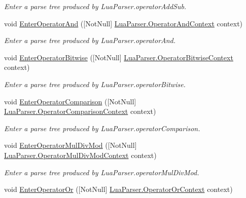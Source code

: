 \begin{DoxyCompactItemize}
\begin{DoxyCompactList}\small\item\em Enter a parse tree produced by Lua\+Parser.\+operator\+Add\+Sub. \end{DoxyCompactList}\item 
void \mbox{\hyperlink{classzlua_1_1_compiler_a028404702602498261a23021b36b5a87}{Enter\+Operator\+And}} (\mbox{[}Not\+Null\mbox{]} \mbox{\hyperlink{classzlua_1_1_lua_parser_1_1_operator_and_context}{Lua\+Parser.\+Operator\+And\+Context}} context)
\begin{DoxyCompactList}\small\item\em Enter a parse tree produced by Lua\+Parser.\+operator\+And. \end{DoxyCompactList}\item 
void \mbox{\hyperlink{classzlua_1_1_compiler_a13c55dd9aa0ccdf16a6855282091f63f}{Enter\+Operator\+Bitwise}} (\mbox{[}Not\+Null\mbox{]} \mbox{\hyperlink{classzlua_1_1_lua_parser_1_1_operator_bitwise_context}{Lua\+Parser.\+Operator\+Bitwise\+Context}} context)
\begin{DoxyCompactList}\small\item\em Enter a parse tree produced by Lua\+Parser.\+operator\+Bitwise. \end{DoxyCompactList}\item 
void \mbox{\hyperlink{classzlua_1_1_compiler_ac4a8baa233d08987d8f276972567c343}{Enter\+Operator\+Comparison}} (\mbox{[}Not\+Null\mbox{]} \mbox{\hyperlink{classzlua_1_1_lua_parser_1_1_operator_comparison_context}{Lua\+Parser.\+Operator\+Comparison\+Context}} context)
\begin{DoxyCompactList}\small\item\em Enter a parse tree produced by Lua\+Parser.\+operator\+Comparison. \end{DoxyCompactList}\item 
void \mbox{\hyperlink{classzlua_1_1_compiler_a59d6144f868523b34a542792c6dfafa2}{Enter\+Operator\+Mul\+Div\+Mod}} (\mbox{[}Not\+Null\mbox{]} \mbox{\hyperlink{classzlua_1_1_lua_parser_1_1_operator_mul_div_mod_context}{Lua\+Parser.\+Operator\+Mul\+Div\+Mod\+Context}} context)
\begin{DoxyCompactList}\small\item\em Enter a parse tree produced by Lua\+Parser.\+operator\+Mul\+Div\+Mod. \end{DoxyCompactList}\item 
void \mbox{\hyperlink{classzlua_1_1_compiler_a75f93e717dd16160d39907f826257579}{Enter\+Operator\+Or}} (\mbox{[}Not\+Null\mbox{]} \mbox{\hyperlink{classzlua_1_1_lua_parser_1_1_operator_or_context}{Lua\+Parser.\+Operator\+Or\+Context}} context)

\end{DoxyCompactItemize}
